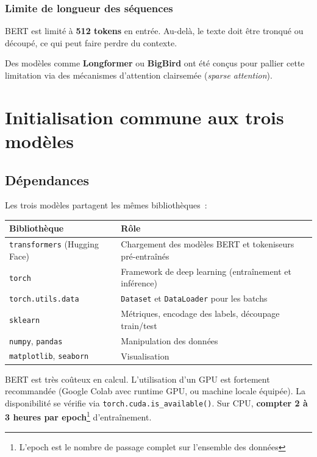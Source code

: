 \documentclass[12pt,a4paper]{article}
\begin{document}
\subsubsection{Limite de longueur des séquences}

BERT est limité à \textbf{512 tokens} en entrée. Au-delà, le texte doit être tronqué ou
découpé, ce qui peut faire perdre du contexte.

\begin{tipbox}
Des modèles comme \textbf{Longformer} ou \textbf{BigBird} ont été conçus pour pallier
cette limitation via des mécanismes d'attention clairsemée (\textit{sparse attention}).
\end{tipbox}

\vfill
\pagebreak
\section{Initialisation commune aux trois modèles}

\subsection{Dépendances}

Les trois modèles partagent les mêmes bibliothèques~:

\begin{center}
\begin{tabular}{@{}lL{9cm}@{}}
  \toprule
  Bibliothèque & Rôle \\
  \midrule
  \texttt{transformers} (Hugging Face) & Chargement des modèles BERT et tokeniseurs pré-entraînés \\
  \texttt{torch} & Framework de deep learning (entraînement et inférence) \\
  \texttt{torch.utils.data} & \texttt{Dataset} et \texttt{DataLoader} pour les batchs \\
  \texttt{sklearn} & Métriques, encodage des labels, découpage train/test \\
  \texttt{numpy}, \texttt{pandas} & Manipulation des données \\
  \texttt{matplotlib}, \texttt{seaborn} & Visualisation \\
  \bottomrule
\end{tabular}
\end{center}

\begin{warnbox}
BERT est très coûteux en calcul. L'utilisation d'un GPU est fortement recommandée
(Google Colab avec runtime GPU, ou machine locale équipée). La disponibilité se vérifie
via \texttt{torch.cuda.is\_available()}. Sur CPU, \textbf{compter 2 à 3 heures par epoch}\footnote{L'epoch est le nombre de passage complet sur l'ensemble des données}
d'entraînement.
\end{warnbox}
\end{document}
